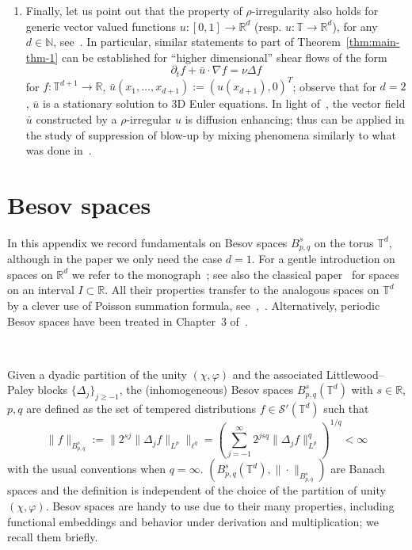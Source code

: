 \documentclass[11pt,oneside,reqno]{amsart}
\newcommand{\assign}{:=}
\newcommand{\tmtextit}[1]{\text{{\itshape{#1}}}}
\newenvironment{enumeratenumeric}{\begin{enumerate}[1.] }{\end{enumerate}}
\numberwithin{equation}{section}
\begin{document}
\begin{enumeratenumeric}
  \item Finally, let us point out that the property of $\rho$-irregularity
  also holds for generic vector valued functions $u : [0, 1] \rightarrow
  \mathbb{R}^d$ (resp. $u : \mathbb{T} \rightarrow \mathbb{R}^d$), for any $d
  \in \mathbb{N}$, see~{\cite{galeati2020prevalence}}. In particular, similar
  statements to part \tmtextit{i.} of Theorem~\ref{thm:main-thm-1} can be
  established for ``higher dimensional'' shear flows of the form
  \[ \partial_t f + \bar{u} \cdot \nabla f = \nu \Delta f \]
  for $f : \mathbb{T}^{d + 1} \rightarrow \mathbb{R}$, $\bar{u} (x_1, \ldots,
  x_{d + 1}) \assign (u (x_{d + 1}), 0)^T$; observe that for $d = 2$,
  $\bar{u}$ is a stationary solution to $3$D Euler equations. In light
  of~{\cite{constantin2008}}, the vector field $\bar{u}$ constructed by a
  $\rho$-irregular $u$ is diffusion enhancing; thus can be applied in the
  study of suppression of blow-up by mixing phenomena similarly to what was
  done in~{\cite{kiselev2016,bedrossian2017suppression,iyer2021}}.
\end{enumeratenumeric}
\appendix\section{Besov spaces}\label{app:besov}

In this appendix we record fundamentals on Besov spaces $B^s_{p, q}$ on the
torus $\mathbb{T}^d$, although in the paper we only need the case $d = 1$. For
a gentle introduction on spaces on $\mathbb{R}^d$ we refer to the
monograph~{\cite{bahouri}}; see also the classical paper~{\cite{simon}} for
spaces on an interval $I \subset \mathbb{R}$. All their properties transfer to
the analogous spaces on $\mathbb{T}^d$ by a clever use of Poisson summation
formula, see~{\cite{gubinelli2015lectures}},~{\cite{mourrat}}. Alternatively,
periodic Besov spaces have been treated in Chapter~3
of~{\cite{schmeisser1987}}.

\

Given a dyadic partition of the unity $(\chi, \varphi)$ and the associated
Littlewood--Paley blocks $\{ \Delta_j \}_{j \geqslant - 1}$, the
(inhomogeneous) Besov spaces $B^s_{p, q} (\mathbb{T}^d)$ with $s \in
\mathbb{R}$, $p, q$ are defined as the set of tempered distributions $f \in
\mathcal{S}' (\mathbb{T}^d)$ such that
\[ \| f \|_{B^s_{p, q}} \assign \| 2^{s j}  \| \Delta_j f \|_{L^p} \|_{\ell^q}
   = \left( \sum_{j = - 1}^{\infty} 2^{j s q}  \| \Delta_j f \|_{L^p}^q
   \right)^{1 / q} < \infty \]
with the usual conventions when $q = \infty$. $(B^s_{p, q} (\mathbb{T}^d), \|
\cdot \|_{B^s_{p, q}})$ are Banach spaces and the definition is independent of
the choice of the partition of unity $(\chi, \varphi)$. Besov spaces are handy
to use due to their many properties, including functional embeddings and
behavior under derivation and multiplication; we recall them briefly.
\end{document}
